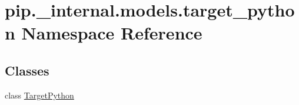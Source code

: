 \hypertarget{namespacepip_1_1__internal_1_1models_1_1target__python}{}\section{pip.\+\_\+internal.\+models.\+target\+\_\+python Namespace Reference}
\label{namespacepip_1_1__internal_1_1models_1_1target__python}
\subsection*{Classes}
\begin{DoxyCompactItemize}
\item 
class \hyperlink{classpip_1_1__internal_1_1models_1_1target__python_1_1TargetPython}{Target\+Python}
\end{DoxyCompactItemize}

